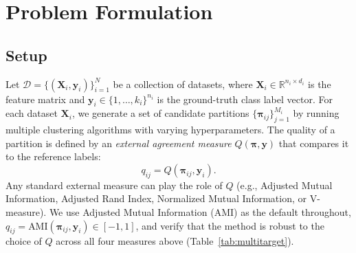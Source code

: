\documentclass[10pt]{article} %
\begin{document}
\section{Problem Formulation}
\label{sec:problem}

\subsection{Setup}

Let $\mathcal{D} = \{(\mathbf{X}_i, \mathbf{y}_i)\}_{i=1}^{N}$ be a collection of datasets, where $\mathbf{X}_i \in \mathbb{R}^{n_i \times d_i}$ is the feature matrix and $\mathbf{y}_i \in \{1, \ldots, k_i\}^{n_i}$ is the ground-truth class label vector. For each dataset $\mathbf{X}_i$, we generate a set of candidate partitions $\{\boldsymbol{\pi}_{ij}\}_{j=1}^{M_i}$ by running multiple clustering algorithms with varying hyperparameters. The quality of a partition is defined by an \emph{external agreement measure} $Q(\boldsymbol{\pi}, \mathbf{y})$ that compares it to the reference labels:
\begin{equation}
    q_{ij} = Q(\boldsymbol{\pi}_{ij}, \mathbf{y}_i).
\end{equation}
Any standard external measure can play the role of $Q$ (e.g., Adjusted Mutual Information, Adjusted Rand Index, Normalized Mutual Information, or V-measure). We use Adjusted Mutual Information (AMI) as the default throughout, $q_{ij} = \text{AMI}(\boldsymbol{\pi}_{ij}, \mathbf{y}_i) \in [-1, 1]$, and verify that the method is robust to the choice of $Q$ across all four measures above (Table~\ref{tab:multitarget}).
\end{document}
